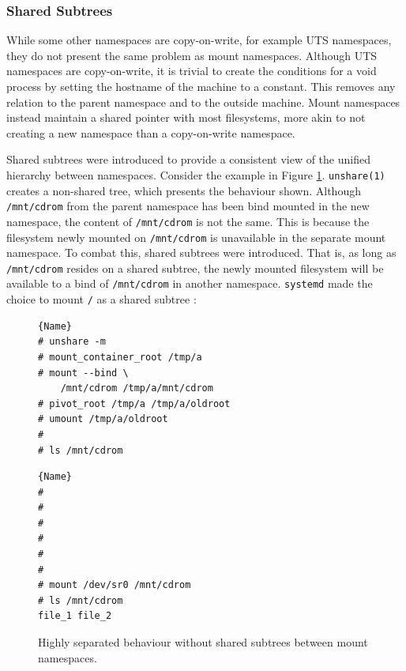 \documentclass[sigplan]{acmart}
\begin{document}

\subsubsection{Shared Subtrees}
\label{sec:shared-subtrees}

While some other namespaces are copy-on-write, for example UTS namespaces, they do not present the same problem as mount namespaces. Although UTS namespaces are copy-on-write, it is trivial to create the conditions for a void process by setting the hostname of the machine to a constant. This removes any relation to the parent namespace and to the outside machine. Mount namespaces instead maintain a shared pointer with most filesystems, more akin to not creating a new namespace than a copy-on-write namespace.

Shared subtrees \citep{pai_shared_2005} were introduced to provide a consistent view of the unified hierarchy between namespaces. Consider the example in Figure \ref{fig:shared-subtrees}. \texttt{unshare(1)} creates a non-shared tree, which presents the behaviour shown. Although \texttt{/mnt/cdrom} from the parent namespace has been bind mounted in the new namespace, the content of \texttt{/mnt/cdrom} is not the same. This is because the filesystem newly mounted on \texttt{/mnt/cdrom} is unavailable in the separate mount namespace. To combat this, shared subtrees were introduced. That is, as long as \texttt{/mnt/cdrom} resides on a shared subtree, the newly mounted filesystem will be available to a bind of \texttt{/mnt/cdrom} in another namespace. \texttt{systemd} made the choice to mount \texttt{/} as a shared subtree \citep{free_software_foundation_mount_namespaces7_2021}:

\begin{figure}
\begin{minipage}{.45\textwidth}

\begin{lstlisting}[frame=tlrb,showlines=true]{Name}
# unshare -m
# mount_container_root /tmp/a
# mount --bind \
    /mnt/cdrom /tmp/a/mnt/cdrom
# pivot_root /tmp/a /tmp/a/oldroot
# umount /tmp/a/oldroot
#
# ls /mnt/cdrom

\end{lstlisting}

\end{minipage}\hfill
\begin{minipage}{.45\textwidth}

\begin{lstlisting}[frame=tlrb]{Name}
#
#
#
#
#
#
# mount /dev/sr0 /mnt/cdrom
# ls /mnt/cdrom
file_1 file_2
\end{lstlisting}

\end{minipage}

\caption{Highly separated behaviour without shared subtrees between mount namespaces.}
\label{fig:shared-subtrees}
\end{figure}
\end{document}
